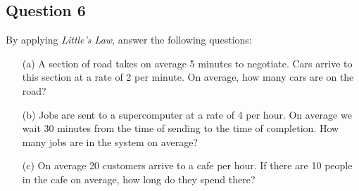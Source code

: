 



\subsection*{Question 6}
By applying \emph{Little's Law}, answer the following questions:\\[-0.2cm]
\begin{itemize}
\item[(a)] A section of road takes on average 5 minutes to negotiate. Cars arrive to this section at a rate of 2 per minute. On average, how many cars are on the road?   \item[(b)] Jobs are sent to a supercomputer at a rate of 4 per hour. On average we wait 30 minutes from the time of sending to the time of completion. How many jobs are in the system on average?  \item[(c)] On average 20 customers arrive to a cafe per hour. If there are 10 people in the cafe on average, how long do they spend there?
\end{itemize}


